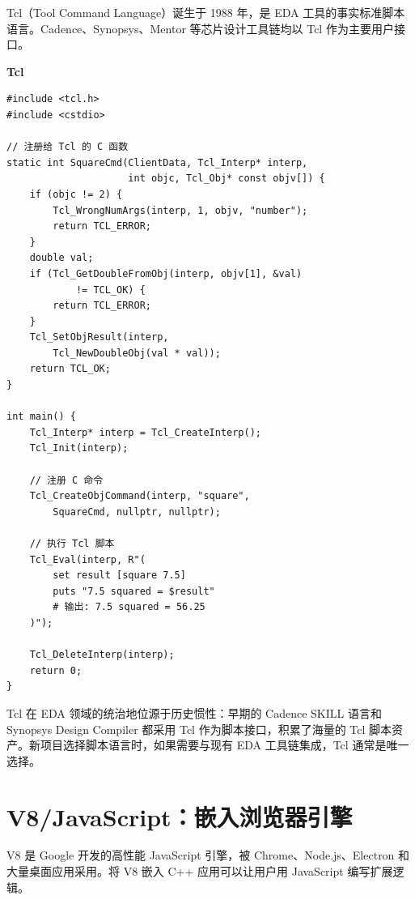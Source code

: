 \documentclass[12pt,a4paper,fontset=fandol]{ctexbook}
\newenvironment{note}[1][]{%
  \begin{tcolorbox}[enhanced,breakable,
    colback=orange!5!white,colframe=orange!80!black,
    boxed title style={colback=orange!80!black},
    attach boxed title to top left={yshift=-2mm,xshift=2mm},
    arc=2mm,boxrule=0.8mm,
    title={注意},#1]}%
  {\end{tcolorbox}}
\newcommand{\tcllabel}{%
  \noindent\begin{tcolorbox}[colback=tclheadbg,coltext=white,
    sharp corners,boxrule=0pt,width=2.8em,height=1.4em,
    halign=center,valign=center,nobeforeafter,left=0pt,right=0pt,
    top=0pt,bottom=0pt]\small\bfseries Tcl\end{tcolorbox}}
\begin{document}
Tcl（Tool Command Language）诞生于 1988 年，是 EDA 工具的事实标准脚本语言。Cadence、Synopsys、Mentor 等芯片设计工具链均以 Tcl 作为主要用户接口。

\tcllabel
\begin{lstlisting}[style=cppstyle]
#include <tcl.h>
#include <cstdio>

// 注册给 Tcl 的 C 函数
static int SquareCmd(ClientData, Tcl_Interp* interp,
                     int objc, Tcl_Obj* const objv[]) {
    if (objc != 2) {
        Tcl_WrongNumArgs(interp, 1, objv, "number");
        return TCL_ERROR;
    }
    double val;
    if (Tcl_GetDoubleFromObj(interp, objv[1], &val)
            != TCL_OK) {
        return TCL_ERROR;
    }
    Tcl_SetObjResult(interp,
        Tcl_NewDoubleObj(val * val));
    return TCL_OK;
}

int main() {
    Tcl_Interp* interp = Tcl_CreateInterp();
    Tcl_Init(interp);

    // 注册 C 命令
    Tcl_CreateObjCommand(interp, "square",
        SquareCmd, nullptr, nullptr);

    // 执行 Tcl 脚本
    Tcl_Eval(interp, R"(
        set result [square 7.5]
        puts "7.5 squared = $result"
        # 输出: 7.5 squared = 56.25
    )");

    Tcl_DeleteInterp(interp);
    return 0;
}
\end{lstlisting}

\begin{note}[title={Tcl 的工业地位}]
Tcl 在 EDA 领域的统治地位源于历史惯性：早期的 Cadence SKILL 语言和 Synopsys Design Compiler 都采用 Tcl 作为脚本接口，积累了海量的 Tcl 脚本资产。新项目选择脚本语言时，如果需要与现有 EDA 工具链集成，Tcl 通常是唯一选择。
\end{note}

\section{V8/JavaScript：嵌入浏览器引擎}\label{sec:v8}

V8 是 Google 开发的高性能 JavaScript 引擎，被 Chrome、Node.js、Electron 和大量桌面应用采用。将 V8 嵌入 C++ 应用可以让用户用 JavaScript 编写扩展逻辑。
\end{document}
